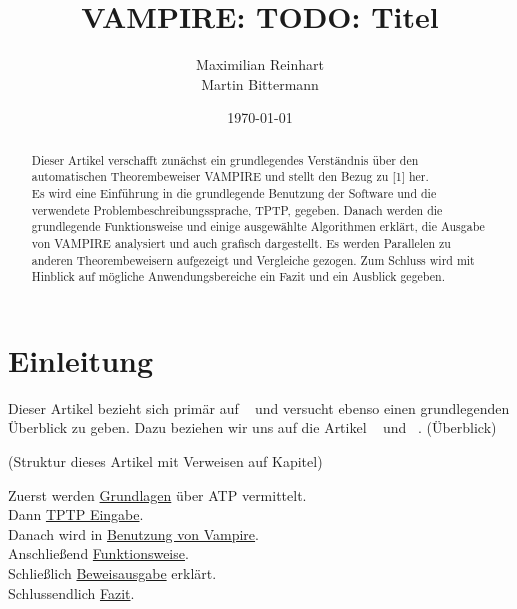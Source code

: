 \documentclass{acm_proc_article-sp-german}
\begin{document}
\title{VAMPIRE: TODO: Titel}
\author{
	\alignauthor
	Maximilian Reinhart\\
	\alignauthor
	Martin Bittermann\\
}

\date{\today}

\maketitle

\begin{abstract}

Dieser Artikel verschafft zunächst ein grundlegendes Verständnis über den automatischen Theorembeweiser VAMPIRE und
stellt den Bezug zu [1] her. \\
Es wird eine Einführung in die grundlegende Benutzung der Software und die verwendete Problembeschreibungssprache, TPTP, gegeben. 
Danach werden die grundlegende Funktionsweise und einige ausgewählte Algorithmen erklärt, 
die Ausgabe von VAMPIRE analysiert und auch grafisch dargestellt.
Es werden Parallelen zu anderen Theorembeweisern aufgezeigt und Vergleiche gezogen.
Zum Schluss wird mit Hinblick auf mögliche Anwendungsbereiche ein Fazit und ein Ausblick gegeben.
\end{abstract}


\section{Einleitung}
\label{sec:introduction}


Dieser Artikel bezieht sich primär auf ~\cite{cav2013} und versucht ebenso einen grundlegenden Überblick zu geben.
Dazu beziehen wir uns auf die Artikel ~\cite{hoder2010} und ~\cite{kovacs2009finding}.
(Überblick) 

(Struktur dieses Artikel mit Verweisen auf Kapitel)

Zuerst werden \hyperref[sec:foundations]{Grundlagen} über ATP vermittelt.\\
Dann \hyperref[sec:input]{TPTP Eingabe}.\\
Danach wird in \hyperref[sec:invocation]{Benutzung von Vampire}.\\
Anschließend \hyperref[sec:mechanics]{Funktionsweise}.\\
Schließlich \hyperref[sec:output]{Beweisausgabe} erklärt.\\
Schlussendlich \hyperref[sec:conclusion]{Fazit}.
\end{document}
